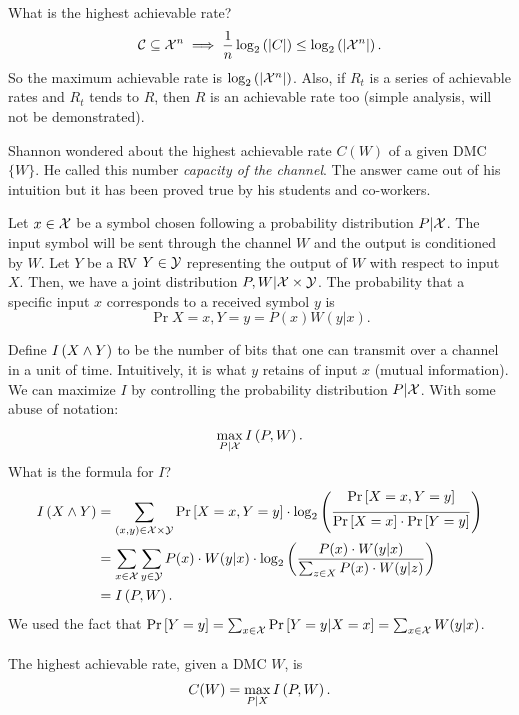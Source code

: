 What is the highest achievable rate?
\begin{equation*}
	\mathcal{C} \subseteq \mathcal{X}^n \implies \frac{1}{n} \log_2 \left( {\left|{C}\right|} \right) \le \log_2 \left( {\left|{\mathcal{X}^n}\right|} \right).
\end{equation*}
So the maximum achievable rate is $\log_2 \left( {\left|{\mathcal{X}^n}\right|} \right)$.
Also, if $R_t$ is a series of achievable rates and $R_t$ tends to $R$, then $R$ is an achievable rate too (simple analysis, will not be demonstrated).

Shannon wondered about the highest achievable rate $C(W)$ of a given DMC $\{W\}$.
He called this number \emph{capacity of the channel}.
The answer came out of his intuition but it has been proved true by his students and co-workers.

Let $x \in \mathcal{X}$ be a symbol chosen following a probability distribution $P|\mathcal{X}$.
The input symbol will be sent through the channel $W$ and the output is conditioned by $W$.
Let $Y$ be a \ac{RV} $Y \in \mathcal{Y}$ representing the output of $W$ with respect to input $X$.
Then, we have a joint distribution $P, W | \mathcal{X} \times \mathcal{Y}$.
The probability that a specific input $x$ corresponds to a received symbol $y$ is
\begin{equation*}
	\Pr{X = x, Y = y} = P(x) W(y|x).
\end{equation*}

Define $I \left( {X \land Y} \right)$ to be the number of bits that one can transmit over a channel in a unit of time.
Intuitively, it is what $y$ retains of input $x$ (mutual information).
We can maximize $I$ by controlling the probability distribution $P|\mathcal{X}$.
With some abuse of notation:
\begin{equation*}
	\max_{P|\mathcal{X}} I \left( {P, W} \right).
\end{equation*}
What is the formula for $I$?
\begin{align*}
	I \left( {X \land Y} \right)
	& =
	\sum_{(x, y) \in \mathcal{X} \times \mathcal{Y}}
	\mathop{\mathrm{Pr}}\limits_{} \left[ {X=x, Y=y} \right] \cdot
	\log_2 \left( {\frac{\mathop{\mathrm{Pr}}\limits_{} \left[ {X=x, Y=y} \right]}{\mathop{\mathrm{Pr}}\limits_{} \left[ {X=x} \right] \cdot \mathop{\mathrm{Pr}}\limits_{} \left[ {Y=y} \right]}} \right)
	\\
	& =
	\sum_{x \in \mathcal{X}}
	\sum_{y \in \mathcal{Y}}
	P(x) \cdot W(y|x) \cdot
	\log_2 \left( {\frac{P(x) \cdot W(y|x)}{\sum_{z \in X} P(x) \cdot W(y|z)}} \right)
	\\
	& =
	I \left( {P, W} \right).
\end{align*}
We used the fact that $\mathop{\mathrm{Pr}}\limits_{} \left[ {Y = y} \right] = \sum_{x \in \mathcal{X}} \mathop{\mathrm{Pr}}\limits_{} \left[ {Y = y | X = x} \right] = \sum_{x \in \mathcal{X}} W(y|x)$.

\begin{thm}\label{thm:nct}
	The highest achievable rate, given a \ac{DMC} $W$, is
	\begin{equation*}
		C(W) = \max_{P|X} I \left( {P, W} \right).
	\end{equation*}
\end{thm}

